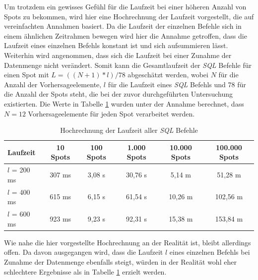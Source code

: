 Um trotzdem ein gewisses Gefühl für die Laufzeit bei einer höheren
Anzahl von Spots zu bekommen, wird hier eine Hochrechnung der Laufzeit
vorgestellt, die auf vereinfachten Annahmen basiert. Da die Laufzeit
der einzelnen Befehle sich in einem ähnlichen Zeitrahmen bewegen wird
hier die Annahme getroffen, dass die Laufzeit eines einzelnen Befehls
konstant ist und sich aufsummieren lässt. Weiterhin wird angenommen,
dass sich die Laufzeit bei einer Zunahme der Datenmenge nicht
verändert. Somit kann die Gesamtlaufzeit der \textit{SQL} Befehle für
einen Spot mit $L = ((N+1) * l) / 78$ abgeschätzt werden, wobei $N$
für die Anzahl der Vorhersageelemente, $l$ für die Laufzeit eines
\textit{SQL} Befehls und 78 für die Anzahl der Spots steht, die bei
der zuvor durchgeführten Untersuchung existierten. Die Werte in
Tabelle \ref{tab:sql_laufzeit} wurden unter der Annahme berechnet,
dass $N=12$ Vorhersageelemente für jeden Spot verarbeitet werden.

\begin{table}[h]
  \centering
  {\sf
    \footnotesize
    \begin{longtable}{l|c|c|c|c|c}

      \toprule
      \textbf{Laufzeit} & \textbf{10 Spots} & \textbf{100 Spots} & \textbf{1.000 Spots} & \textbf{10.000 Spots} & \textbf{100.000 Spots} \\
      \midrule
      $l$ = 200 ms & 307 ms & 3,08 s & 30,76 s &  5,14 m &  51,28 m \\
      $l$ = 400 ms & 615 ms & 6,15 s & 61,54 s & 10,26 m & 102,56 m \\
      $l$ = 600 ms & 923 ms & 9,23 s & 92,31 s & 15,38 m & 153,84 m \\
      \bottomrule

    \end{longtable}
  }

  \caption{Hochrechnung der Laufzeit aller \textit{SQL} Befehle}
  \label{tab:sql_laufzeit}

\end{table}

Wie nahe die hier vorgestellte Hochrechnung an der Realität ist,
bleibt allerdings offen. Da davon ausgegangen wird, dass die Laufzeit
$l$ eines einzelnen Befehls bei Zunahme der Datenmenge ebenfalls
steigt, würden in der Realität wohl eher schlechtere Ergebnisse als in
Tabelle \ref{tab:sql_laufzeit} erzielt werden.

